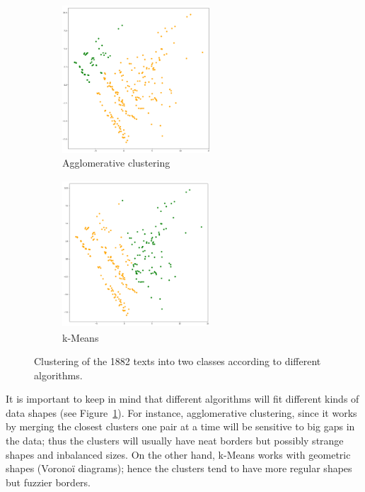 \documentclass[a4paper,11pt]{article}
\begin{document}
\begin{figure}
	\begin{subfigure}{0.5\textwidth}
		\includegraphics[width=5.5cm, height=5.5cm, keepaspectratio]{./img/cha2_82}
		\caption{Agglomerative clustering}
	\end{subfigure}
	\begin{subfigure}{0.5\textwidth}
		\includegraphics[width=5.5cm, height=5.5cm, keepaspectratio]{./img/km2_82}
		\caption{k-Means}
	\end{subfigure}
\caption{Clustering of the 1882 texts into two classes according to different algorithms.}
\label{fig:cha_km}
\end{figure}

It is important to keep in mind that different algorithms will fit different kinds of data shapes (see Figure~\ref{fig:cha_km}). For instance, agglomerative clustering, since it works by merging the closest clusters one pair at a time will be sensitive to big gaps in the data; thus the clusters will usually have neat borders but possibly strange shapes and inbalanced sizes. On the other hand, k-Means works with geometric shapes (Voronoï diagrams); hence the clusters tend to have more regular shapes but fuzzier borders.
\end{document}
